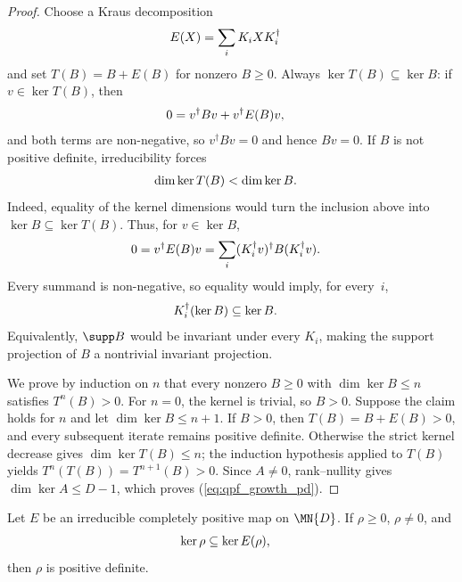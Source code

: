 \begin{proof}\leanok
    Choose a Kraus decomposition
    \begin{align}
        E(X)
         & =\sum_i K_iXK_i^\dagger
        \notag
    \end{align}
    and set $T(B)=B+E(B)$ for nonzero $B\geq0$. Always
    $\ker T(B)\subseteq\ker B$: if $v\in\ker T(B)$, then
    \begin{align}
        0
         & =v^\dagger Bv+v^\dagger E(B)v,
        \notag
    \end{align}
    and both terms are non-negative, so $v^\dagger Bv=0$ and hence $Bv=0$.
    If $B$ is not positive definite, irreducibility forces
    \begin{align}
        \dim\ker T(B)
         & <\dim\ker B.
        \notag
    \end{align}
    Indeed, equality of the kernel dimensions would turn the inclusion above
    into $\ker B\subseteq\ker T(B)$. Thus, for $v\in\ker B$,
    \begin{align}
        0
         & =v^\dagger E(B)v
        =\sum_i(K_i^\dagger v)^\dagger B(K_i^\dagger v).
        \notag
    \end{align}
    Every summand is non-negative, so equality would imply, for every~$i$,
    \begin{align}
        K_i^\dagger(\ker B)
         & \subseteq\ker B.
        \notag
    \end{align}
    Equivalently, $\supp B$ would be invariant under every $K_i$, making the
    support projection of $B$ a nontrivial invariant projection.

    We prove by induction on $n$ that every nonzero $B\geq0$ with
    $\dim\ker B\leq n$ satisfies $T^n(B)>0$. For $n=0$, the kernel is
    trivial, so $B>0$. Suppose the claim holds for $n$ and let
    $\dim\ker B\leq n+1$. If $B>0$, then $T(B)=B+E(B)>0$, and every
    subsequent iterate remains positive definite. Otherwise the strict
    kernel decrease gives $\dim\ker T(B)\leq n$; the induction hypothesis
    applied to $T(B)$ yields
    $T^n(T(B))=T^{n+1}(B)>0$. Since $A\neq0$, rank--nullity gives
    $\dim\ker A\leq D-1$, which proves (\ref{eq:qpf_growth_pd}).
\end{proof}

\begin{theorem}
    \label{thm:kernel_inclusion_pd_irred}
    \leanok
    Let $E$ be an irreducible completely positive map on $\MN{D}$.
    If $\rho\geq0$, $\rho\neq0$, and
    \begin{align}
        \ker\rho
         & \subseteq\ker E(\rho),
        \notag
    \end{align}
    then $\rho$ is positive definite.
\end{theorem}

